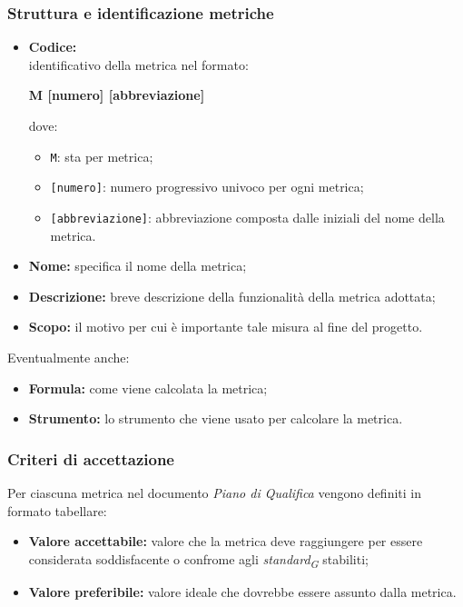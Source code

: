 \subsubsection{Struttura e identificazione metriche}
\begin{itemize}
    \item \textbf{Codice:} \\
    identificativo della metrica nel formato:
        \begin{center}
            \textbf{M [numero] [abbreviazione]}
        \end{center}
        dove:
        \begin{itemize}
            \item \texttt{M}: sta per metrica;
            \item \texttt{[numero]}: numero progressivo univoco per ogni metrica;
            \item \texttt{[abbreviazione]}: abbreviazione composta dalle iniziali del nome della metrica.
        \end{itemize}
    \item \textbf{Nome:} specifica il nome della metrica;
    \item \textbf{Descrizione:} breve descrizione della funzionalità della metrica adottata;
    \item \textbf{Scopo:} il motivo per cui è importante tale misura al fine del progetto.
\end{itemize}
    \vspace{0.2cm}
Eventualmente anche:
\begin{itemize}
    \item \textbf{Formula:} come viene calcolata la metrica;
    \item \textbf{Strumento:} lo strumento che viene usato per calcolare la metrica.
\end{itemize}

\subsubsection{Criteri di accettazione}
Per ciascuna metrica nel documento \textit{Piano di Qualifica} vengono definiti in formato tabellare:
\begin{itemize}
    \item \textbf{Valore accettabile:} valore che la metrica deve raggiungere per essere considerata soddisfacente o confrome agli \textit{standard}\textsubscript{\textit{G}} stabiliti;
    \item \textbf{Valore preferibile:} valore ideale che dovrebbe essere assunto dalla metrica.
\end{itemize}

